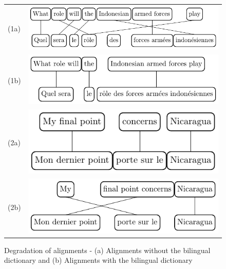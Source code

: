 \documentclass[output=paper,modfonts,nonflat]{langsci/langscibook}
\begin{document}
\begin{figure}
\centering
\begin{tabular}{lC}
(1a) & \includegraphics[scale=.9]{figures/figSemmar3}\\[1ex]
(1b) & \includegraphics[scale=.9]{figures/figSemmar7}\\[2ex]
(2a) & \includegraphics[scale=.9]{figures/figSemmar8}\\[1ex]
(2b) & \includegraphics[scale=.9]{figures/figSemmar9}\\
\end{tabular}
\caption{\label{sem:fig:degali}Degradation of alignments - (a) Alignments without the bilingual dictionary and (b) Alignments with the bilingual dictionary}
\end{figure}
\end{document}
